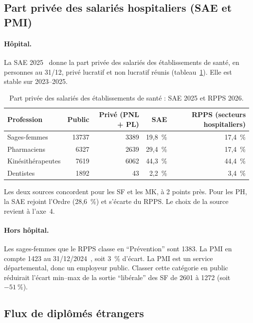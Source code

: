 \subsection{Part privée des salariés hospitaliers (SAE et PMI)}

\paragraph{Hôpital.}
La SAE 2025~\cite{a1-sae708} donne la part privée des salariés des
établissements de santé, en personnes au 31/12, privé lucratif et non
lucratif réunis (tableau~\ref{a1-tab:sae}). Elle est stable sur 2023--2025.

\begin{table}[htbp]
\centering\small
\caption{Part privée des salariés des établissements de santé : SAE 2025 et RPPS 2026\mesure.}\label{a1-tab:sae}
\begin{tabular}{lrrrr}
\toprule
Profession & Public & Privé (PNL + PL) & SAE & RPPS (secteurs hospitaliers) \\
\midrule
Sages-femmes & \num{13737} & \num{3389} & 19,8~\% & 17,4~\% \\
Pharmaciens & \num{6327} & \num{2639} & 29,4~\% & 17,4~\% \\
Kinésithérapeutes & \num{7619} & \num{6062} & 44,3~\% & 44,4~\% \\
Dentistes & \num{1892} & \num{43} & 2,2~\% & 3,4~\% \\
\bottomrule
\end{tabular}
\end{table}

Les deux sources concordent pour les SF et les MK, à 2 points près. Pour
les PH, la SAE rejoint l'Ordre (28,6~\%) et s'écarte du RPPS. Le choix de
la source revient à l'axe~4.

\paragraph{Hors hôpital.}
Les sages-femmes que le RPPS classe en \enquote{Prévention} sont
\num{1383}\mesure. La PMI en compte \num{1423} au
31/12/2024~\cite{a1-dreespmi}, soit 3~\%\derive{} d'écart. La PMI est un
service départemental, donc un employeur public. Classer cette catégorie en
public réduirait l'écart min--max de la sortie \enquote{libérale} des SF de
\num{2601} à \num{1272}\derive{} (soit $-51~\%$).

\subsection{Flux de diplômés étrangers}

